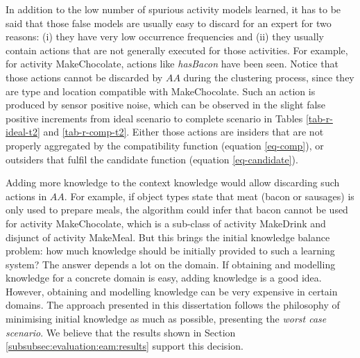
In addition to the low number of spurious activity models learned, it has to be said that those false models are usually easy to discard for an expert for two reasons: (i) they have very low occurrence frequencies and (ii) they usually contain actions that are not generally executed for those activities. For example, for activity MakeChocolate, actions like \textit{hasBacon} have been seen. Notice that those actions cannot be discarded by $AA$ during the clustering process, since they are type and location compatible with MakeChocolate. Such an action is produced by sensor positive noise, which can be observed in the slight false positive increments from ideal scenario to complete scenario in Tables \ref{tab-r-ideal-t2} and \ref{tab-r-comp-t2}. Either those actions are insiders that are not properly aggregated by the compatibility function (equation \ref{eq-comp}), or outsiders that fulfil the candidate function (equation \ref{eq-candidate}). 

Adding more knowledge to the context knowledge would allow discarding such actions in $AA$. For example, if object types state that meat (bacon or sausages) is only used to prepare meals, the algorithm could infer that bacon cannot be used for activity MakeChocolate, which is a sub-class of activity MakeDrink and disjunct of activity MakeMeal. But this brings the initial knowledge balance problem: how much knowledge should be initially provided to such a learning system? The answer depends a lot on the domain. If obtaining and modelling knowledge for a concrete domain is easy, adding knowledge is a good idea. However, obtaining and modelling knowledge can be very expensive in certain domains. The approach presented in this dissertation follows the philosophy of minimising initial knowledge as much as possible, presenting the \textit{worst case scenario}. We believe that the results shown in Section \ref{subsubsec:evaluation:eam:results} support this decision. 

